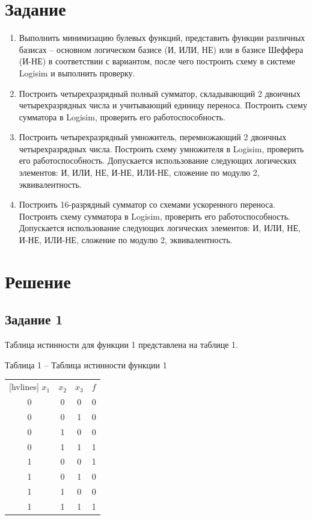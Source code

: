 \documentclass[a4paper,14pt]{extarticle}
\begin{document}
  \section*{Задание}
  \begin{enumerate}
    \item Выполнить минимизацию булевых функций, представить функции различных базисах – основном логическом базисе (И, ИЛИ, НЕ) или в базисе Шеффера (И-НЕ) в соответствии с вариантом, после чего построить схему в системе Logisim и выполнить проверку.
    
    \item Построить четырехразрядный полный сумматор, складывающий 2 двоичных четырехразрядных числа и учитывающий единицу переноса. Построить схему сумматора в Logisim, проверить его работоспособность.
    
    \item Построить четырехразрядный умножитель, перемножающий 2 двоичных четырехразрядных числа. Построить схему умножителя в Logisim, проверить его работоспособность.  Допускается использование следующих логических элементов: И, ИЛИ, НЕ, И-НЕ, ИЛИ-НЕ,  сложение по модулю 2, эквивалентность.
    
    \item Построить 16-разрядный сумматор со схемами ускоренного переноса.  Построить схему сумматора в Logisim, проверить его работоспособность.  Допускается использование следующих логических элементов: И, ИЛИ, НЕ, И-НЕ, ИЛИ-НЕ,  сложение по модулю 2, эквивалентность.
  \end{enumerate}
  
  \newpage
  \section*{Решение}
  \subsection*{Задание 1}
  Таблица истинности для функции 1 представлена на таблице 1.
  
  \noindent Таблица 1 -- Таблица истинности функции 1 \\
  \begin{NiceTabular}{cccc}[hvlines]
    $x_1$ & $x_2$ & $x_3$ & $f$ \\
    0 & 0 & 0 & 0 \\
    0 & 0 & 1 & 0 \\
    0 & 1 & 0 & 0 \\
    0 & 1 & 1 & 1 \\
    1 & 0 & 0 & 1 \\
    1 & 0 & 1 & 0 \\
    1 & 1 & 0 & 0 \\
    1 & 1 & 1 & 1
  \end{NiceTabular}\\
  
\end{document}

